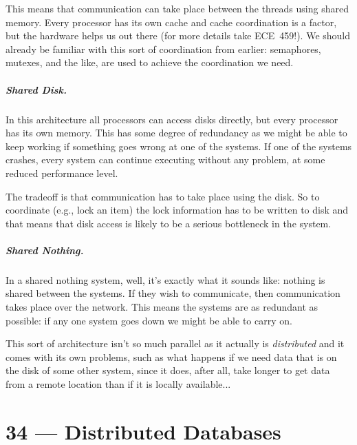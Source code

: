 \documentclass[a4paper]{report}
\begin{document}
This means that communication can take place between the threads using shared memory. Every processor has its own cache and cache coordination is a factor, but the hardware helps us out there (for more details take ECE~459!). We should already be familiar with this sort of coordination from earlier: semaphores, mutexes, and the like, are used to achieve the coordination we need.

\paragraph{Shared Disk.} In this architecture all processors can access disks directly, but every processor has its own memory. This has some degree of redundancy as we might be able to keep working if something goes wrong at one of the systems. If one of the systems crashes, every system can continue executing without any problem, at some reduced performance level. 

The tradeoff is that communication has to take place using the disk. So to coordinate (e.g., lock an item) the lock information has to be written to disk and that means that disk access is likely to be a serious bottleneck in the system.

\paragraph{Shared Nothing.} In a shared nothing system, well, it's exactly what it sounds like: nothing is shared between the systems. If they wish to communicate, then communication takes place over the network. This means the systems are as redundant as possible: if any one system goes down we might be able to carry on. 

This sort of architecture isn't so much parallel as it actually is \textit{distributed} and it comes with its own problems, such as what happens if we need data that is on the disk of some other system, since it does, after all, take longer to get data from a remote location than if it is locally available...









\chapter*{34 --- Distributed Databases}

\end{document}
